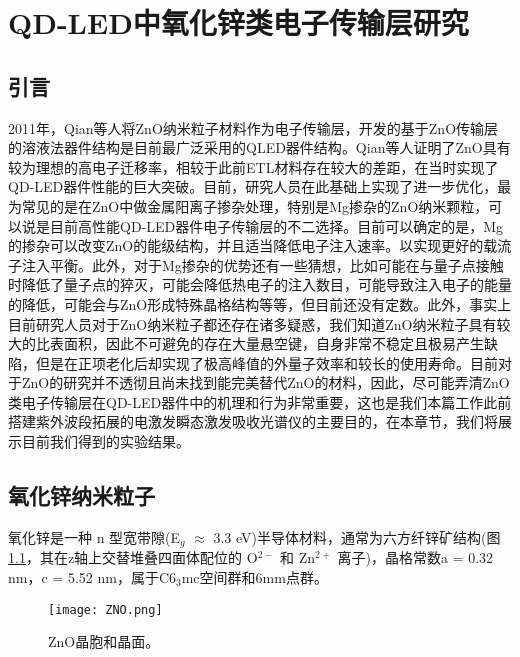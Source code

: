 
\chapter{QD-LED中氧化锌类电子传输层研究}
\section{引言}
2011年，Qian等人将ZnO纳米粒子材料作为电子传输层，开发的基于ZnO传输层的溶液法器件结构是目前最广泛采用的QLED器件结构\cite{qian2011stable}。Qian等人证明了ZnO具有较为理想的高电子迁移率，相较于此前ETL材料存在较大的差距，在当时实现了QD-LED器件性能的巨大突破。目前，研究人员在此基础上实现了进一步优化，最为常见的是在ZnO中做金属阳离子掺杂处理，特别是Mg掺杂的ZnO纳米颗粒，可以说是目前高性能QD-LED器件电子传输层的不二选择。目前可以确定的是，Mg的掺杂可以改变ZnO的能级结构，并且适当降低电子注入速率。以实现更好的载流子注入平衡。此外，对于Mg掺杂的优势还有一些猜想，比如可能在与量子点接触时降低了量子点的猝灭，可能会降低热电子的注入数目，可能导致注入电子的能量的降低，可能会与ZnO形成特殊晶格结构等等，但目前还没有定数。此外，事实上目前研究人员对于ZnO纳米粒子都还存在诸多疑惑，我们知道ZnO纳米粒子具有较大的比表面积，因此不可避免的存在大量悬空键，自身非常不稳定且极易产生缺陷，但是在正项老化后却实现了极高峰值的外量子效率和较长的使用寿命。目前对于ZnO的研究并不透彻且尚未找到能完美替代ZnO的材料，因此，尽可能弄清ZnO类电子传输层在QD-LED器件中的机理和行为非常重要，这也是我们本篇工作此前搭建紫外波段拓展的电激发瞬态激发吸收光谱仪的主要目的，在本章节，我们将展示目前我们得到的实验结果。
\section{氧化锌纳米粒子}
氧化锌是一种 n 型宽带隙(E$_g$ $\approx$ 3.3 eV)半导体材料，通常为六方纤锌矿结构(图\ref{fig:ZnO}，其在z轴上交替堆叠四面体配位的 O$^{2-}$ 和 Zn$^{2+}$ 离子)，晶格常数a = 0.32 nm，c = 5.52 nm，属于C6$_3$mc空间群和6mm点群。
\begin{figure}[ht]
	\centering
	\texttt{[image: ZNO.png]}
	\caption{ZnO晶胞和晶面\cite{kumar2015zinc}。}
	\label{fig:ZnO}
\end{figure}

